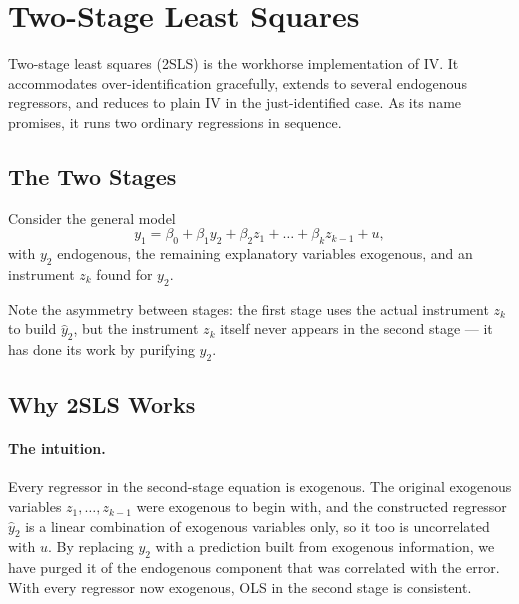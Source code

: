 \section{Two-Stage Least Squares}

Two-stage least squares (2SLS) is the workhorse implementation of IV. It accommodates over-identification gracefully, extends to several endogenous regressors, and reduces to plain IV in the just-identified case. As its name promises, it runs two ordinary regressions in sequence.

\subsection{The Two Stages}

Consider the general model
\[
y_1 = \beta_0 + \beta_1 y_2 + \beta_2 z_1 + \dots + \beta_k z_{k-1} + u,
\]
with $y_2$ endogenous, the remaining explanatory variables exogenous, and an instrument $z_k$ found for $y_2$.


Note the asymmetry between stages: the first stage uses the actual instrument $z_k$ to build $\widehat y_2$, but the instrument $z_k$ itself never appears in the second stage --- it has done its work by purifying $y_2$.

\subsection{Why 2SLS Works}

\paragraph{The intuition.} Every regressor in the second-stage equation is exogenous. The original exogenous variables $z_1,\dots,z_{k-1}$ were exogenous to begin with, and the constructed regressor $\widehat y_2$ is a linear combination of exogenous variables only, so it too is uncorrelated with $u$. By replacing $y_2$ with a prediction built from exogenous information, we have purged it of the endogenous component that was correlated with the error. With every regressor now exogenous, OLS in the second stage is consistent.

